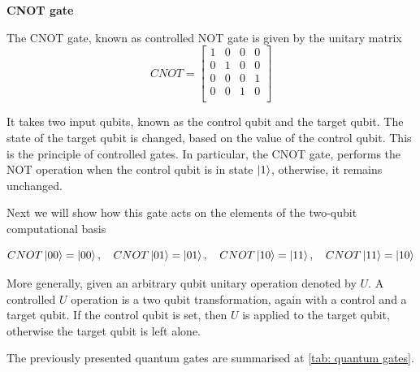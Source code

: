 \vspace{5pt}
\textbf{CNOT gate}

The CNOT gate, known as controlled NOT gate is given by the unitary matrix
\begin{equation}
    CNOT = \begin{bmatrix}
        1&0&0&0\\
        0&1&0&0\\
        0&0&0&1\\
        0&0&1&0\\
    \end{bmatrix}
\end{equation}

It takes two input qubits, known as the control qubit and the target qubit. The state of the target qubit is changed, based  on the value of the control qubit. This is the principle of controlled gates. In particular, the CNOT gate, performs the NOT operation when the  control qubit is in state $\ket{1}$, otherwise, it remains unchanged. 

Next we will show how this gate acts on the elements of the two-qubit computational basis 

\begin{equation}
    CNOT \ket{00} = \ket{00},\quad  CNOT \ket{01} = \ket{01}, \quad CNOT \ket{10} = \ket{11}, \quad  CNOT \ket{11} = \ket{10}
\end{equation}

More generally, given an arbitrary qubit unitary operation denoted by $U$. A controlled $U$ operation is a two qubit transformation, again with a control and a target qubit. If the control qubit is set, then $U$ is applied to the target qubit, otherwise the target qubit is left alone.

The previously presented quantum gates are summarised at \autoref{tab: quantum gates}.

